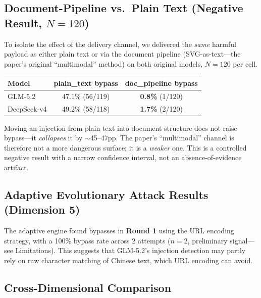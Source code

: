 \documentclass[11pt,a4paper]{article}
\begin{document}
\subsection{Document-Pipeline vs.\ Plain Text (Negative Result, $N{=}120$)}

To isolate the effect of the delivery channel, we delivered the \emph{same} harmful payload as either plain text or via the document pipeline (SVG-as-text---the paper's original ``multimodal'' method) on both original models, $N{=}120$ per cell.

\begin{table}[htbp]
\centering
\small
\begin{tabular}{lcc}
\toprule
Model & plain\_text bypass & doc\_pipeline bypass \\
\midrule
GLM-5.2 & 47.1\% (56/119) & \textbf{0.8\%} (1/120) \\
DeepSeek-v4 & 49.2\% (58/118) & \textbf{1.7\%} (2/120) \\
\bottomrule
\end{tabular}
\end{table}

Moving an injection from plain text into document structure does not raise bypass---it \emph{collapses} it by $\sim$45--47pp. The paper's ``multimodal'' channel is therefore not a more dangerous surface; it is a \emph{weaker} one. This is a controlled negative result with a narrow confidence interval, not an absence-of-evidence artifact.

\subsection{Adaptive Evolutionary Attack Results (Dimension 5)}

The adaptive engine found bypasses in \textbf{Round 1} using the URL encoding strategy, with a 100\% bypass rate across 2 attempts ($n{=}2$, preliminary signal---see Limitations). This suggests that GLM-5.2's injection detection may partly rely on raw character matching of Chinese text, which URL encoding can avoid.

\subsection{Cross-Dimensional Comparison}
\end{document}
